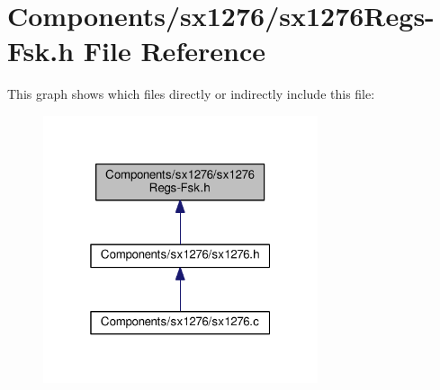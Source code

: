 \hypertarget{sx1276Regs-Fsk_8h}{}\section{Components/sx1276/sx1276\+Regs-\/\+Fsk.h File Reference}
\label{sx1276Regs-Fsk_8h}
This graph shows which files directly or indirectly include this file\+:
\nopagebreak
\begin{figure}[H]
\begin{center}
\leavevmode
\includegraphics[width=229pt]{sx1276Regs-Fsk_8h__dep__incl}
\end{center}
\end{figure}
